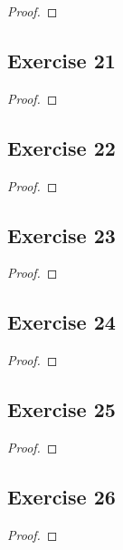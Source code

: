 \documentclass[14pt]{extarticle}
\begin{document}
\begin{proof}

\end{proof}

\subsection{Exercise 21}

\begin{proof}

\end{proof}

\subsection{Exercise 22}

\begin{proof}

\end{proof}

\subsection{Exercise 23}

\begin{proof}

\end{proof}

\subsection{Exercise 24}

\begin{proof}

\end{proof}

\subsection{Exercise 25}

\begin{proof}

\end{proof}

\subsection{Exercise 26}

\begin{proof}

\end{proof}
\end{document}
